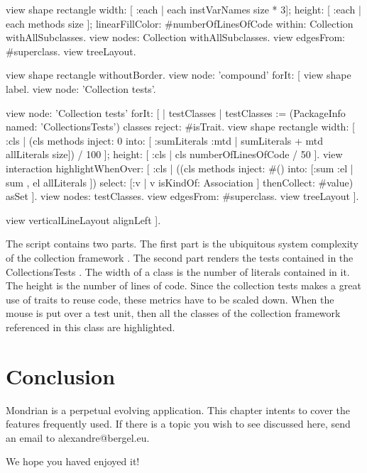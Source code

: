 \documentclass[a4paper,10pt,twoside]{book}
\begin{document}
\begin{code}{}
view shape rectangle
  width: [ :each | each instVarNames size * 3];
  height: [ :each | each methods size ];
  linearFillColor: #numberOfLinesOfCode within: Collection withAllSubclasses.
view nodes: Collection withAllSubclasses.
view edgesFrom: #superclass.
view treeLayout.

view shape rectangle withoutBorder.
view node: 'compound' forIt: [
  view shape label.
  view node: 'Collection tests'.
  
  view node: 'Collection tests' forIt: [
    | testClasses |
    testClasses := (PackageInfo named: 'CollectionsTests') classes reject: #isTrait.
    view shape rectangle
      width: [ :cls | (cls methods inject: 0 into: [ :sumLiterals :mtd | sumLiterals + mtd allLiterals size]) / 100 ];
      height: [ :cls | cls numberOfLinesOfCode / 50 ].
    view interaction 
        highlightWhenOver: [ :cls | ((cls methods inject: #() 
                        into: [:sum :el | sum , el allLiterals ]) select: [:v | v isKindOf: Association ] thenCollect: #value) asSet ].
    view nodes: testClasses.
    view edgesFrom: #superclass.
    view treeLayout ].
  
  view verticalLineLayout alignLeft
].
\end{code}

The script contains two parts. The first part is the ubiquitous system complexity of the collection framework .  The second part renders the tests contained in the CollectionsTests . The width of a class is the number of literals contained in it. The height is the number of lines of code. Since the collection tests makes a great use of traits to reuse code, these metrics have to be scaled down. When the mouse is put over a test unit, then all the classes of the collection framework referenced in this class are highlighted. 

\section{Conclusion}
Mondrian is a perpetual evolving application. This chapter intents to cover the features frequently used. If there is a topic you wish to see discussed here, send an email to alexandre@bergel.eu.

We hope you haved enjoyed it!



\ifx\wholebook\relax\else
   
   
\end{document}
